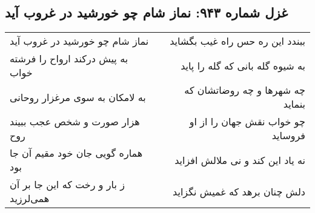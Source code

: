 \begin{center}
\section*{غزل شماره ۹۴۳: نماز شام چو خورشید در غروب آید}
\label{sec:0943}
\begin{longtable}{l p{0.5cm} r}
نماز شام چو خورشید در غروب آید
&&
ببندد این ره حس راه غیب بگشاید
\\
به پیش درکند ارواح را فرشته خواب
&&
به شیوه گله بانی که گله را پاید
\\
به لامکان به سوی مرغزار روحانی
&&
چه شهرها و چه روضاتشان که بنماید
\\
هزار صورت و شخص عجب ببیند روح
&&
چو خواب نقش جهان را از او فروساید
\\
هماره گویی جان خود مقیم آن جا بود
&&
نه یاد این کند و نی ملالش افزاید
\\
ز بار و رخت که این جا بر آن همی‌لرزید
&&
دلش چنان برهد که غمیش نگزاید
\\
\end{longtable}
\end{center}
